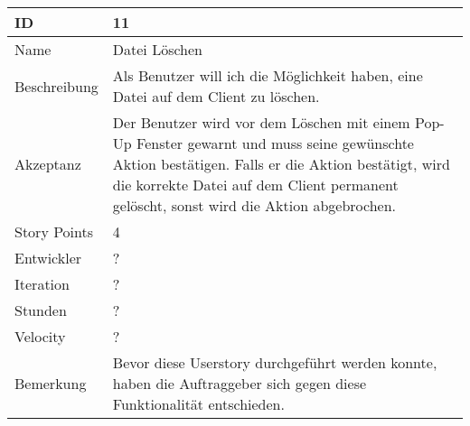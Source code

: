 \begin{table}[htbp]
    \begin{minipage}{\linewidth}
        \setlength{\tymax}{0.5\linewidth}
        \centering
        \small
        \begin{tabulary}{\textwidth}{|l|p{10cm}|} \hline
            ID   &11\\\hline
            Name  &Datei Löschen\\\hline
	    Beschreibung&Als Benutzer will ich die Möglichkeit haben, eine Datei auf dem Client zu löschen.\\\hline
	    Akzeptanz &Der Benutzer wird vor dem Löschen mit einem Pop-Up Fenster gewarnt und muss seine gewünschte Aktion bestätigen. Falls er die Aktion bestätigt, wird die korrekte Datei auf dem Client permanent gelöscht, sonst wird die Aktion abgebrochen.\\\hline
            Story Points&4\\\hline
            Entwickler &?\\\hline
            Iteration &?\\\hline
            Stunden  &?\\\hline
            Velocity &?\\\hline
            Bemerkung & Bevor diese Userstory durchgeführt werden konnte, haben die Auftraggeber sich gegen diese Funktionalität entschieden.
            \\\hline
        \end{tabulary}
    \end{minipage}
\end{table}



